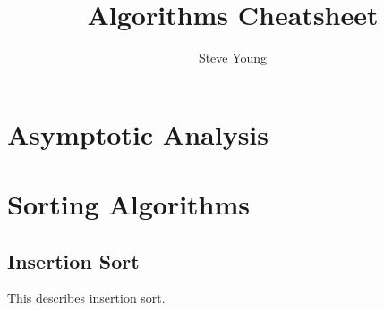 \documentclass[11pt]{article}
\title{Algorithms Cheatsheet}
\author{Steve Young}
\begin{document}
\maketitle


\section{Asymptotic Analysis}


\section{Sorting Algorithms}

\subsection{Insertion Sort}
This describes insertion sort.


\newpage
\printbibliography[heading=bibintoc]

\end{document}
